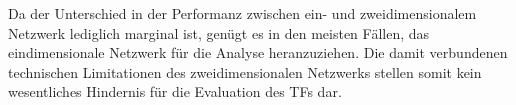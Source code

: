 Da der Unterschied in der Performanz zwischen ein- und zweidimensionalem Netzwerk lediglich marginal ist, genügt es in den meisten Fällen, das 
eindimensionale Netzwerk für die Analyse heranzuziehen. Die damit verbundenen technischen Limitationen des zweidimensionalen Netzwerks stellen 
somit kein wesentliches Hindernis für die Evaluation des TFs dar.
